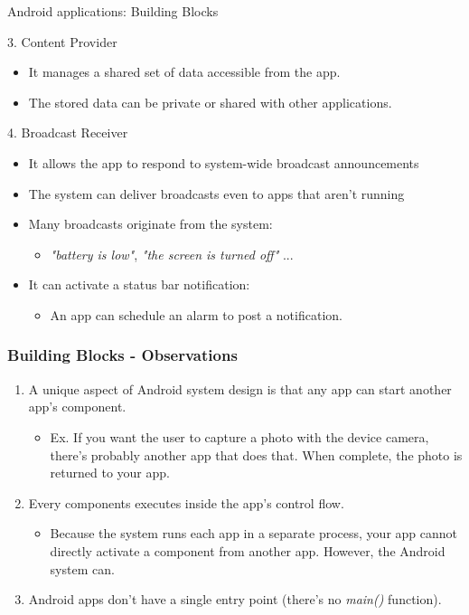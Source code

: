 \documentclass{beamer}
\begin{document}
\begin{frame}[allowframebreaks]{Android applications: Building Blocks}
  \begin{block}{3. Content Provider}
    \begin{itemize}
    \item It manages a shared set of data accessible from the app.
    \item The stored data can be private or shared with other applications.
    \end{itemize}
  \end{block}

  \begin{block}{4. Broadcast Receiver}
    \begin{itemize}
      \item It allows the app to respond to system-wide broadcast announcements
      \item The system can deliver broadcasts even to apps that aren't running
      \item Many broadcasts originate from the system:
      \begin{itemize}
        \item \textit{"battery is low"}, \textit{"the screen is turned off"} ...
      \end{itemize}
      \item It can activate a status bar notification:
      \begin{itemize}
        \item An app can schedule an alarm to post a notification.
      \end{itemize}
    \end{itemize}
  \end{block}
\end{frame}

\begin{frame}
  \frametitle{Building Blocks - Observations}
  \begin{enumerate}\itemsep20pt
    \item A unique aspect of Android system design is that any app can start another app’s component.
    \begin{itemize}
      \item Ex. If you want the user to capture a photo with the device camera, there's probably another app that does that. When complete, the photo is returned to your app.
    \end{itemize}
    \item Every components executes inside the app's control flow.
    \begin{itemize}
      \item Because the system runs each app in a separate process, your app cannot directly activate a component from another app. However, the Android system can.
    \end{itemize}
    \item Android apps don't have a single entry point (there's no \textit{main()} function).
  \end{enumerate}
\end{frame}
\end{document}
